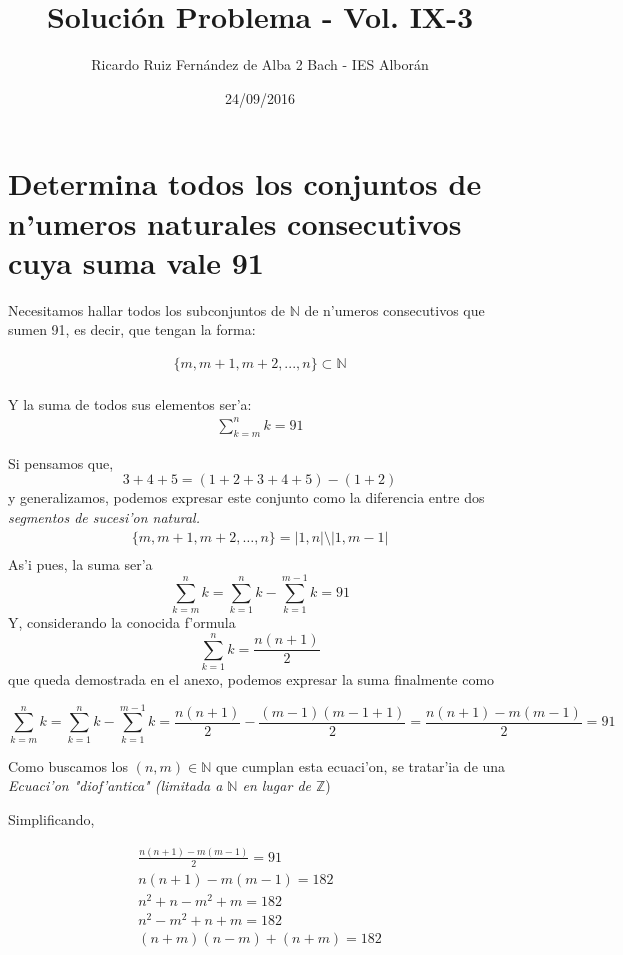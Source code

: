 \documentclass[12pt]{article}
\title{\textbf{Soluci\'on Problema - Vol. IX-3}}
\author{Ricardo Ruiz Fern\'andez de Alba 2 Bach - IES Albor\'an}
\date{24/09/2016}
\begin{document}
\maketitle

\section*{Determina todos los conjuntos de n'umeros naturales consecutivos cuya suma vale 91}

Necesitamos hallar todos los subconjuntos de $\mathbb{N}$ de n'umeros consecutivos que sumen 91, es decir, que tengan la forma:

\begin{align*}
	\{m, m+1, m+2, ..., n \} \subset \mathbb{N} \\
\end{align*}

Y la suma de todos sus elementos ser'a:
\begin{align*}
	\sum_{k=m}^nk = 91
\end{align*}

Si pensamos que, $$3+4+5= (1+2+3+4+5) - (1+2)$$ y generalizamos, podemos expresar este conjunto como la diferencia entre dos \emph{segmentos de sucesi'on natural.}
\begin{align*}
\{m, m+1, m+2, \ldots, n\} = |1, n| \setminus |1, m-1|\\
\end{align*}
As'i pues, la suma ser'a
$$
\sum_{k=m}^nk = \sum_{k=1}^nk- \sum_{k=1}^{m-1}k = 91
$$
Y, considerando la conocida f'ormula
$$
\sum_{k=1}^nk=\frac{n(n+1)}{2}
$$
que queda demostrada en el anexo, podemos expresar la suma finalmente como

$$
\sum_{k=m}^nk = \sum_{k=1}^nk- \sum_{k=1}^{m-1}k =\frac{n(n+1)}{2} - \frac{(m-1)(m-1+1)}{2} =\frac{n(n+1) - m(m-1)}{2} = 91
$$

Como buscamos los $(n,m)\in\mathbb{N}$ que cumplan esta ecuaci'on, se tratar'ia de una \emph{Ecuaci'on "diof'antica" (limitada a $\mathbb{N}$ en lugar de $\mathbb{Z}$})

Simplificando,

\begin{align*}
\frac{n(n+1) - m(m-1)}{2} = 91 \\
n(n+1) - m(m-1) = 182 \\
n^2+n-m^2+m = 182 \\
n^2-m^2+n+m = 182 \\
(n+m)(n-m)+(n+m) = 182 \\
\end{align*}
\end{document}
